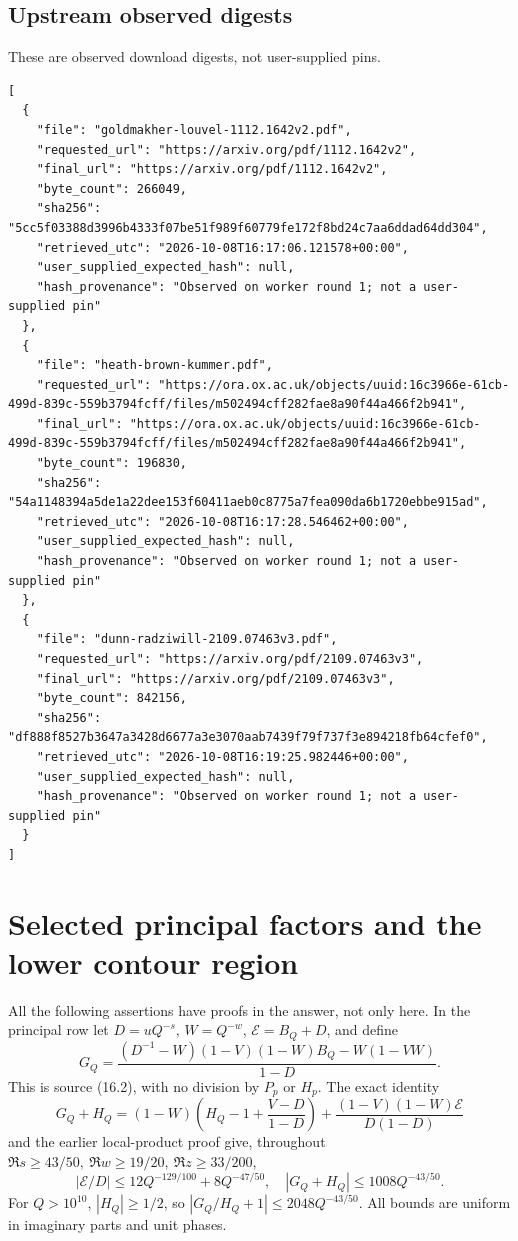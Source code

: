 \documentclass[12pt]{article}
\begin{document}
\subsection{Upstream observed digests}
These are observed download digests, not user-supplied pins.
\begin{verbatim}
[
  {
    "file": "goldmakher-louvel-1112.1642v2.pdf",
    "requested_url": "https://arxiv.org/pdf/1112.1642v2",
    "final_url": "https://arxiv.org/pdf/1112.1642v2",
    "byte_count": 266049,
    "sha256": "5cc5f03388d3996b4333f07be51f989f60779fe172f8bd24c7aa6ddad64dd304",
    "retrieved_utc": "2026-10-08T16:17:06.121578+00:00",
    "user_supplied_expected_hash": null,
    "hash_provenance": "Observed on worker round 1; not a user-supplied pin"
  },
  {
    "file": "heath-brown-kummer.pdf",
    "requested_url": "https://ora.ox.ac.uk/objects/uuid:16c3966e-61cb-499d-839c-559b3794fcff/files/m502494cff282fae8a90f44a466f2b941",
    "final_url": "https://ora.ox.ac.uk/objects/uuid:16c3966e-61cb-499d-839c-559b3794fcff/files/m502494cff282fae8a90f44a466f2b941",
    "byte_count": 196830,
    "sha256": "54a1148394a5de1a22dee153f60411aeb0c8775a7fea090da6b1720ebbe915ad",
    "retrieved_utc": "2026-10-08T16:17:28.546462+00:00",
    "user_supplied_expected_hash": null,
    "hash_provenance": "Observed on worker round 1; not a user-supplied pin"
  },
  {
    "file": "dunn-radziwill-2109.07463v3.pdf",
    "requested_url": "https://arxiv.org/pdf/2109.07463v3",
    "final_url": "https://arxiv.org/pdf/2109.07463v3",
    "byte_count": 842156,
    "sha256": "df888f8527b3647a3428d6677a3e3070aab7439f79f737f3e894218fb64cfef0",
    "retrieved_utc": "2026-10-08T16:19:25.982446+00:00",
    "user_supplied_expected_hash": null,
    "hash_provenance": "Observed on worker round 1; not a user-supplied pin"
  }
]
\end{verbatim}

\section{Selected principal factors and the lower contour region}
All the following assertions have proofs in the answer, not only here.
In the principal row let \(D=uQ^{-s}\), \(W=Q^{-w}\),
\(\mathcal E=B_Q+D\), and define
\[
 G_Q=\frac{(D^{-1}-W)(1-V)(1-W)B_Q-W(1-VW)}{1-D}.
\]
This is source (16.2), with no division by \(P_p\) or \(H_p\).
The exact identity
\[
 G_Q+H_Q=(1-W)\left(H_Q-1+\frac{V-D}{1-D}\right)
       +\frac{(1-V)(1-W)\mathcal E}{D(1-D)}
\]
and the earlier local-product proof give, throughout
\(\Re s\ge43/50,\ \Re w\ge19/20,\ \Re z\ge33/200\),
\[
 |\mathcal E/D|\le12Q^{-129/100}+8Q^{-47/50},\quad
 |G_Q+H_Q|\le1008Q^{-43/50}.
\]
For \(Q>10^{10}\), \(|H_Q|\ge1/2\), so
\(|G_Q/H_Q+1|\le2048Q^{-43/50}\).  All bounds are uniform in
imaginary parts and unit phases.
\end{document}
